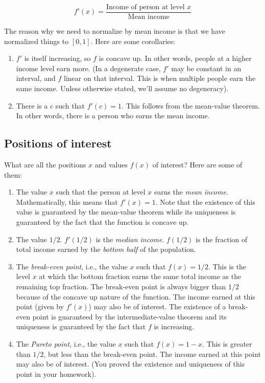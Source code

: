 \documentclass{amsart}
\begin{document}
$$f'(x) = \frac{\text{Income of person at level $x$}}{\text{Mean income}}$$

The reason why we need to normalize by mean income is that we have
normalized things to $[0,1]$. Here are some corollaries:

\begin{enumerate}
\item $f'$ is itself increasing, so $f$ is concave up. In other words,
  people at a higher income level earn more. (In a degenerate case,
  $f'$ may be constant in an interval, and $f$ linear on that
  interval. This is when multiple people earn the same income. Unless
  otherwise stated, we'll assume no degeneracy).
\item There is a $c$ such that $f'(c) = 1$. This follows from the
  mean-value theorem. In other words, there is a person who earns the
  mean income.
\end{enumerate}

\subsection*{Positions of interest}

What are all the positions $x$ and values $f(x)$ of interest? Here are
some of them:

\begin{enumerate}
\item The value $x$ such that the person at level $x$ earns the {\em
  mean income}. Mathematically, this means that $f'(x) = 1$. Note that
  the existence of this value is guaranteed by the mean-value theorem
  while its uniqueness is guaranteed by the fact that the function is
  concave up.
\item The value $1/2$. $f'(1/2)$ is the {\em median income}. $f(1/2)$
  is the fraction of total income earned by the {\em bottom half} of the
  population.
\item The {\em break-even point}, i.e., the value $x$ such that $f(x)
  = 1/2$. This is the level $x$ at which the bottom fraction earns the
  same total income as the remaining top fraction. The break-even
  point is always bigger than $1/2$ because of the concave up nature
  of the function. The income earned at this point (given by $f'(x)$)
  may also be of interest. The existence of a break-even point is
  guaranteed by the intermediate-value theorem and its uniqueness is
  guaranteed by the fact that $f$ is increasing.
\item The {\em Pareto point}, i.e., the value $x$ such that $f(x) = 1
  - x$. This is greater than $1/2$, but less than the break-even
  point. The income earned at this point may also be of interest. (You
  proved the existence and uniqueness of this point in your homework).
\end{enumerate}
\end{document}
